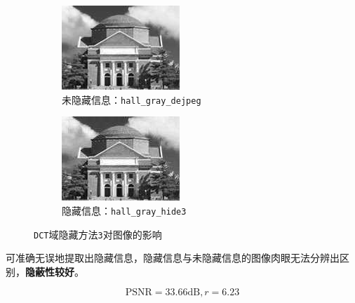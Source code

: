 \documentclass{article}
\numberwithin{figure}{section}
\numberwithin{table}{section}
\numberwithin{listing}{section}
\numberwithin{equation}{section}
\begin{document}
\begin{enumerate}
\begin{enumerate}
                        \begin{figure}[H]
                            \centering
                            \begin{subfigure}{0.5\textwidth}
                                \centering
                                \includegraphics[width=0.6\linewidth]{hall_gray_dejpeg}
                                \caption{未隐藏信息：\texttt{hall\_gray\_dejpeg}}
                            \end{subfigure}%
                            \begin{subfigure}{0.5\textwidth}
                                \centering
                                \includegraphics[width=0.6\linewidth]{hall_gray_hide3}
                                \caption{隐藏信息：\texttt{hall\_gray\_hide3}}
                            \end{subfigure}
                            \caption{\texttt{DCT}域隐藏方法\texttt{3}对图像的影响}
                        \end{figure}

                        可准确无误地提取出隐藏信息，隐藏信息与未隐藏信息的图像肉眼无法分辨出区别，\textbf{隐蔽性较好}。

                        $$\textrm{PSNR}=33.66\textrm{dB}, r=6.23$$

                \end{enumerate}


\end{enumerate}
\end{document}
